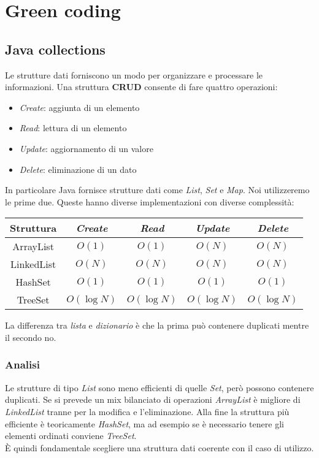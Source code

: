 \newpage
\section{Green coding}
\subsection{Java collections}
Le strutture dati forniscono un modo per organizzare e processare le informazioni. Una struttura \textbf{CRUD} consente di fare quattro operazioni:
\begin{itemize}
	\item \textit{Create}: aggiunta di un elemento
	\item \textit{Read}: lettura di un elemento
	\item \textit{Update}: aggiornamento di un valore
	\item \textit{Delete}: eliminazione di un dato
\end{itemize}
In particolare Java fornisce strutture dati come \textit{List}, \textit{Set} e \textit{Map}. Noi utilizzeremo le prime due. Queste hanno diverse implementazioni con diverse complessità:
\begin{table}[!h]
	\centering
	\begin{tabular}{|c|c|c|c|c|}
		\hline
		\textbf{Struttura} & \textit{Create} & \textit{Read} & \textit{Update} & \textit{Delete} \\
		\hline
		ArrayList & $O(1)$ & $O(1)$ & $O(N)$ & $O(N)$ \\
		LinkedList & $O(N)$ & $O(N)$ & $O(N)$ & $O(N)$\\
		HashSet & $O(1)$ & $O(1)$ & $O(1)$ & $O(1)$\\
		TreeSet & $O(\log N)$ & $O(\log N)$ & $O(\log N)$ & $O(\log N)$\\
		\hline
	\end{tabular}
\end{table}
\begin{note}
	La differenza tra \textit{lista} e \textit{dizionario} è che la prima può contenere duplicati mentre il secondo no.
\end{note}

\subsubsection{Analisi}
Le strutture di tipo \textit{List} sono meno efficienti di quelle \textit{Set}, però possono contenere duplicati. Se si prevede un mix bilanciato di operazioni \textit{ArrayList} è migliore di \textit{LinkedList} tranne per la modifica e l'eliminazione. Alla fine la struttura più efficiente è teoricamente \textit{HashSet}, ma ad esempio se è necessario tenere gli elementi ordinati conviene \textit{TreeSet}.\\
È quindi fondamentale scegliere una struttura dati coerente con il caso di utilizzo.

